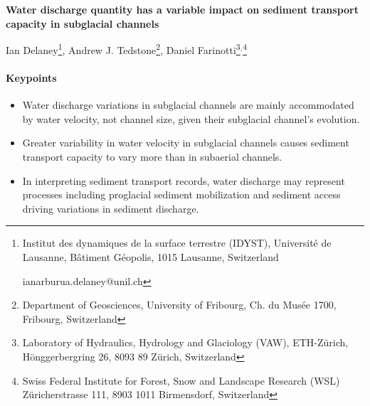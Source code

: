 \documentclass[11pt]{article}
\begin{document}
% 
% 


\begin{center}
  \Large{\textbf{Water discharge quantity has a variable impact on sediment transport capacity in subglacial channels}}
  \normalsize

  Ian Delaney\footnote{Institut des dynamiques de la surface terrestre (IDYST), Universit\'{e} de Lausanne, B\^{a}timent G\'{e}opolis, 1015 Lausanne, Switzerland 

    ianarburua.delaney@unil.ch},
  Andrew J. Tedstone\footnote{Department of Geosciences, University of Fribourg, Ch. du Musée 1700, Fribourg, Switzerland},
  Daniel Farinotti\footnote{Laboratory of Hydraulics, Hydrology and Glaciology (VAW), ETH-Z\"urich, H\"onggerbergring 26, 8093 89 Z\"urich, Switzerland}$^{,}$\footnote{Swiss Federal Institute for Forest, Snow and Landscape Research (WSL) Z\"uricherstrasse 111, 8903 1011 Birmensdorf, Switzerland}
 

  

\end{center}

\paragraph{Keypoints}
\begin{itemize}
\item Water discharge variations in subglacial channels are mainly accommodated by water velocity, not channel size, given their subglacial channel's evolution.

\item Greater variability in water velocity in subglacial channels causes sediment transport capacity to vary more than in subaerial channels.

\item In interpreting sediment transport records, water discharge may represent processes including proglacial sediment mobilization and sediment access driving variations in sediment discharge.
\end{itemize}
\end{document}

